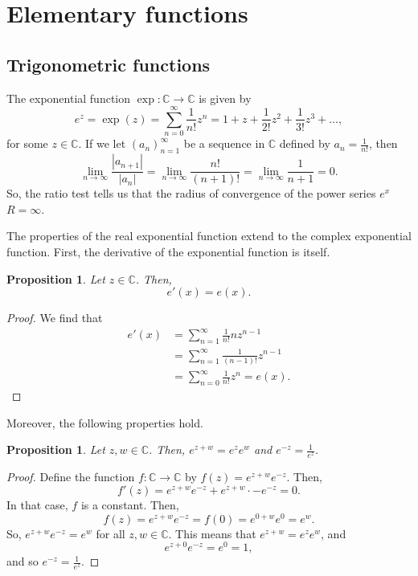 \documentclass[a4paper, openany]{memoir}
\theoremstyle{definition}
\theoremstyle{plain}
\newtheorem{proposition}[definition]{Proposition}
\begin{document}
\newpage

\section{Elementary functions}
\subsection{Trigonometric functions}
The exponential function $\exp: \mathbb{C} \to \mathbb{C}$ is given by
\[e^z = \exp (z) = \sum_{n=0}^{\infty} \frac{1}{n!} z^n = 1 + z + \frac{1}{2!} z^2 + \frac{1}{3!} z^3 + \dots,\]
for some $z \in \mathbb{C}$. If we let $(a_n)_{n=1}^{\infty}$ be a sequence in $\mathbb{C}$ defined by $a_n = \frac{1}{n!}$, then
\[\lim_{n \to \infty} \frac{|a_{n+1}|}{|a_n|} = \lim_{n \to \infty} \frac{n!}{(n+1)!} = \lim_{n \to \infty} \frac{1}{n+1} = 0.\]
So, the ratio test tells us that the radius of convergence of the power series $e^x$ $R = \infty$. 

The properties of the real exponential function extend to the complex exponential function. First, the derivative of the exponential function is itself.
\begin{proposition}
Let $z \in \mathbb{C}$. Then, 
\[e'(x) = e(x).\]
\end{proposition}
\begin{proof}
We find that
\begin{align*}
    e'(x) &= \sum_{n=1}^{\infty} \frac{1}{n!} nz^{n-1} \\
    &= \sum_{n=1}^{\infty} \frac{1}{(n-1)!} z^{n-1} \\
    &= \sum_{n=0}^{\infty} \frac{1}{n!} z^n = e(x).
\end{align*}
\end{proof}
\noindent Moreover, the following properties hold.
\begin{proposition}
Let $z, w \in \mathbb{C}$. Then, $e^{z + w} = e^z e^w$ and $e^{-z} = \frac{1}{e^z}$.
\end{proposition}
\begin{proof}
Define the function $f: \mathbb{C} \to \mathbb{C}$ by $f(z) = e^{z + w} e^{-z}$. Then,
\[f'(z) = e^{z + w} e^{-z} + e^{z + w} \cdot -e^{-z} = 0.\]
In that case, $f$ is a constant. Then,
\[f(z) = e^{z + w} e^{-z} = f(0) = e^{0 + w} e^{0} = e^w.\]
So, $e^{z+w} e^{-z} = e^w$ for all $z, w \in \mathbb{C}$. This means that $e^{z+w} = e^z e^w$, and 
\[e^{z+0} e^{-z} = e^0 = 1,\]
and so $e^{-z} = \frac{1}{e^z}$.
\end{proof}
\end{document}
